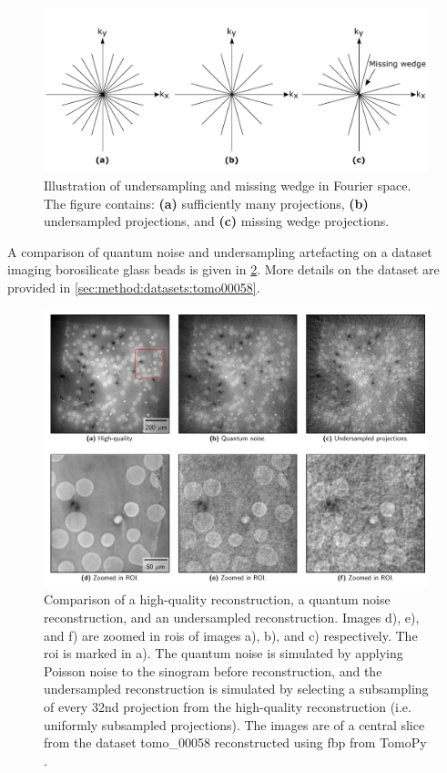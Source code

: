 \begin{figure}[htbp]  
    \centering
    \includegraphics[width=.8\textwidth]{figures/undersampling.pdf}
    \caption[Illustration of undersampling and missing wedge in Fourier space]{Illustration of undersampling and missing wedge in Fourier space. The figure contains: \textbf{(a)} sufficiently many projections, \textbf{(b)} undersampled projections, and \textbf{(c)} missing wedge projections. }
    \label{fig:undersampling}
\end{figure}

A comparison of quantum noise and undersampling artefacting on a dataset imaging borosilicate glass beads is given in \cref{fig:noisecomparison}. More details on the dataset are provided in \cref{sec:method:datasets:tomo00058}. 

\begin{figure}[htbp]  
    \centering
    \includegraphics[width=.9\textwidth]{figures/noisecomparison.pdf}
    \caption[Illustration of reconstruction noise and artefacting]{Comparison of a high-quality reconstruction, a quantum noise reconstruction, and an undersampled reconstruction. Images d), e), and f) are zoomed in \gls{roi}s of images a), b), and c) respectively. The \gls{roi} is marked in a). The quantum noise is simulated by applying Poisson noise to the sinogram before reconstruction, and the undersampled reconstruction is simulated by selecting a subsampling of every 32nd projection from the high-quality reconstruction (i.e. uniformly subsampled projections). The images are of a central slice from the dataset tomo\_00058 \cite{datasetglassspheres} reconstructed using \gls{fbp} from TomoPy \cite{TomoBank}. }
    \label{fig:noisecomparison}
\end{figure}

